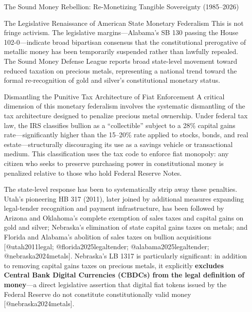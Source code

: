 \documentclass[
  ignorenonframetext,
]{beamer}
\begin{document}
\begin{frame}{The Sound Money Rebellion: Re-Monetizing Tangible
Sovereignty (1985--2026)}
\begin{block}{The Legislative Renaissance of American State Monetary
Federalism}
This is not fringe activism. The legislative margins---Alabama's SB 130
passing the House 102-0---indicate broad bipartisan consensus that the
constitutional prerogative of metallic money has been temporarily
suspended rather than lawfully repealed. The Sound Money Defense League
reports broad state-level movement toward reduced taxation on precious
metals, representing a national trend toward the formal re-recognition
of gold and silver's constitutional monetary status.
\end{block}

\begin{block}{Dismantling the Punitive Tax Architecture of Fiat
Enforcement}
\protect{}\label{dismantling-the-punitive-tax-architecture-of-fiat-enforcement}
A critical dimension of this monetary federalism involves the systematic
dismantling of the tax architecture designed to penalize precious metal
ownership. Under federal tax law, the IRS classifies bullion as a
``collectible'' subject to a 28\% capital gains rate---significantly
higher than the 15--20\% rate applied to stocks, bonds, and real
estate---structurally discouraging its use as a savings vehicle or
transactional medium. This classification uses the tax code to enforce
fiat monopoly: any citizen who seeks to preserve purchasing power in
constitutional money is penalized relative to those who hold Federal
Reserve Notes.

The state-level response has been to systematically strip away these
penalties. Utah's pioneering HB 317 (2011), later joined by additional
measures expanding legal-tender recognition and payment infrastructure,
has been followed by Arizona and Oklahoma's complete exemption of sales
taxes and capital gains on gold and silver; Nebraska's elimination of
state capital gains taxes on metals; and Florida and Alabama's abolition
of sales taxes on bullion acquisitions {[}@utah2011legal;
@florida2025legaltender; @alabama2025legaltender;
@nebraska2024metals{]}. Nebraska's LB 1317 is particularly significant:
in addition to removing capital gains taxes on precious metals, it
explicitly \textbf{excludes Central Bank Digital Currencies (CBDCs) from
the legal definition of money}---a direct legislative assertion that
digital fiat tokens issued by the Federal Reserve do not constitute
constitutionally valid money {[}@nebraska2024metals{]}.


\end{block}
\end{frame}
\end{document}
